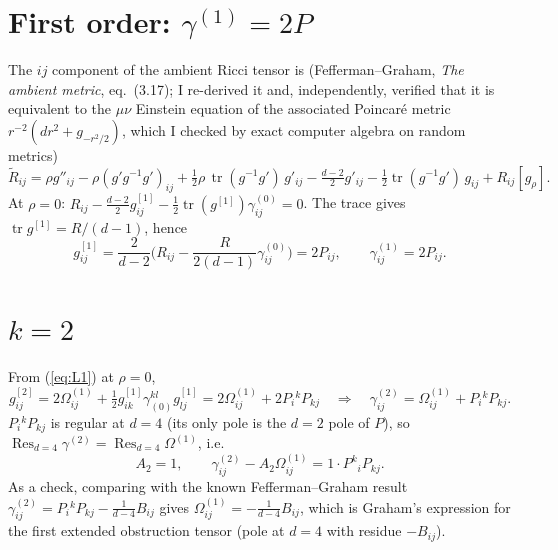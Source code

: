 \documentclass[11pt]{article}
\newcommand{\tr}{\operatorname{tr}}
\newcommand{\Res}{\operatorname{Res}}
\begin{document}
\section{First order: $\gamma^{(1)}=2P$}
The $ij$ component of the ambient Ricci tensor is (Fefferman--Graham, \emph{The ambient metric}, eq.\ (3.17); I re-derived it and, independently, verified that it is equivalent to the $\mu\nu$ Einstein equation of the associated Poincar\'e metric $r^{-2}(dr^2+g_{-r^2/2})$, which I checked by exact computer algebra on random metrics)
\begin{equation}
\tilde R_{ij}=\rho g''_{ij}-\rho(g'g^{-1}g')_{ij}+\tfrac12\rho\,\tr(g^{-1}g')\,g'_{ij}-\tfrac{d-2}{2}g'_{ij}-\tfrac12\tr(g^{-1}g')\,g_{ij}+R_{ij}[g_\rho].
\end{equation}
At $\rho=0$: $R_{ij}-\frac{d-2}{2}g^{[1]}_{ij}-\frac12\tr(g^{[1]})\gamma^{(0)}_{ij}=0$. The trace gives $\tr g^{[1]}=R/(d-1)$, hence
\begin{equation}
g^{[1]}_{ij}=\frac{2}{d-2}\Big(R_{ij}-\frac{R}{2(d-1)}\gamma^{(0)}_{ij}\Big)=2P_{ij},\qquad \gamma^{(1)}_{ij}=2P_{ij}.
\end{equation}

\section{$k=2$}
From (\ref{eq:L1}) at $\rho=0$,
\begin{equation}
g^{[2]}_{ij}=2\Omega^{(1)}_{ij}+\tfrac12 g^{[1]}_{ik}\gamma_{(0)}^{kl}g^{[1]}_{lj}=2\Omega^{(1)}_{ij}+2P_i{}^kP_{kj}
\quad\Longrightarrow\quad
\gamma^{(2)}_{ij}=\Omega^{(1)}_{ij}+P_i{}^kP_{kj}.
\end{equation}
$P_i{}^kP_{kj}$ is regular at $d=4$ (its only pole is the $d=2$ pole of $P$), so $\Res_{d=4}\gamma^{(2)}=\Res_{d=4}\Omega^{(1)}$, i.e.
\begin{equation}
A_2=1,\qquad \gamma^{(2)}_{ij}-A_2\Omega^{(1)}_{ij}=1\cdot P^k{}_iP_{kj}.
\end{equation}
As a check, comparing with the known Fefferman--Graham result $\gamma^{(2)}_{ij}=P_i{}^kP_{kj}-\frac{1}{d-4}B_{ij}$ gives $\Omega^{(1)}_{ij}=-\frac{1}{d-4}B_{ij}$, which is Graham's expression for the first extended obstruction tensor (pole at $d=4$ with residue $-B_{ij}$).
\end{document}
